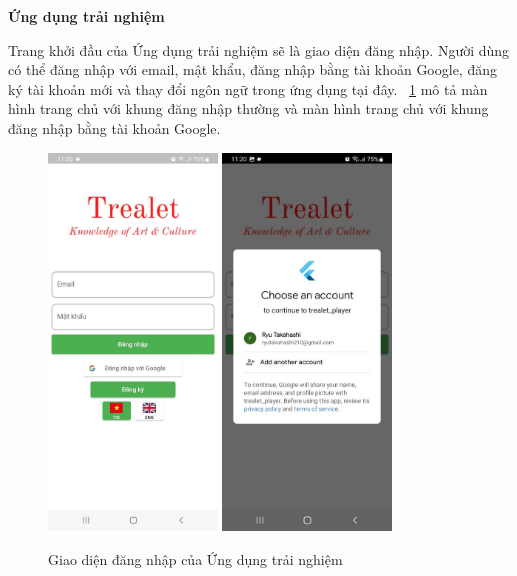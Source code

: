 \newpage
\textbf{Ứng dụng trải nghiệm}

Trang khởi đầu của Ứng dụng trải nghiệm sẽ là giao diện đăng nhập. Người
dùng có thể đăng nhập với email, mật khẩu, đăng nhập bằng tài khoản Google, đăng
ký tài khoản mới và thay đổi ngôn ngữ trong ứng dụng tại đây. \figurename~\ref{fig:player-login} mô tả màn hình trang chủ với khung đăng nhập thường và màn hình trang chủ với khung đăng
nhập bằng tài khoản Google.
\begin{figure}[h]
    \centering
    \includegraphics[width=0.4\textwidth]{figures/player-login-1.jpg}
    \includegraphics[width=0.4\textwidth]{figures/player-login-2.jpg}
    \caption{Giao diện đăng nhập của Ứng dụng trải nghiệm}
    \label{fig:player-login}
\end{figure}
